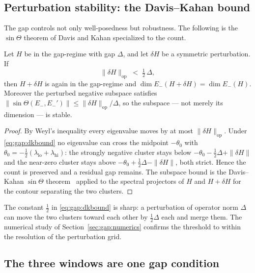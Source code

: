\subsection{Perturbation stability: the Davis--Kahan bound}
\label{sec:gap:dk}

The gap controls not only well-posedness but robustness. The following is the
$\sin\Theta$ theorem of Davis and Kahan specialized to the count.

\begin{proposition}
\label{prop:gap:dk}
Let $H$ be in the gap-regime with gap $\Delta$, and let $\delta H$ be a
symmetric perturbation. If
\begin{equation}
  \|\delta H\|_{\mathrm{op}} \;<\; \tfrac12\,\Delta,
  \label{eq:gap:dkbound}
\end{equation}
then $H+\delta H$ is again in the gap-regime and
$\dim E_-(H+\delta H) = \dim E_-(H)$. Moreover the perturbed negative
subspace satisfies $\|\sin\Theta(E_-,E_-')\| \le \|\delta H\|_{\mathrm{op}}/\Delta$,
so the subspace --- not merely its dimension --- is stable.
\end{proposition}

\begin{proof}
By Weyl's inequality every eigenvalue moves by at most
$\|\delta H\|_{\mathrm{op}}$. Under \eqref{eq:gap:dkbound} no eigenvalue can
cross the midpoint $-\theta_0$ with
$\theta_0 = -\tfrac12(\lambda_{\mathrm{lo}}+\lambda_{\mathrm{hi}})$: the
strongly negative cluster stays below $-\theta_0-\tfrac12\Delta+\|\delta H\|$
and the near-zero cluster stays above $-\theta_0+\tfrac12\Delta-\|\delta H\|$,
both strict. Hence the count is preserved and a residual gap remains. The
subspace bound is the Davis--Kahan $\sin\Theta$ theorem~\cite{davis1970rotation} applied to the
spectral projectors of $H$ and $H+\delta H$ for the contour separating the
two clusters.
\end{proof}

The constant $\tfrac12$ in \eqref{eq:gap:dkbound} is sharp: a perturbation of
operator norm $\Delta$ can move the two clusters toward each other by
$\tfrac12\Delta$ each and merge them. The numerical study of
Section~\ref{sec:gap:numerics} confirms the threshold to within the
resolution of the perturbation grid.

\subsection{The three windows are one gap condition}
\label{sec:gap:windows}

